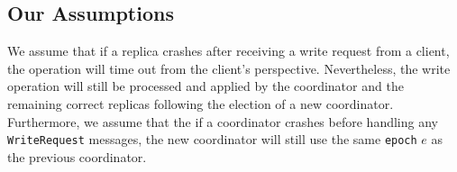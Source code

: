 \subsection{Our Assumptions}
We assume that if a replica crashes after receiving a write request from a
client, the operation will time out from the client's perspective.
Nevertheless, the write operation will still be processed and applied by the
coordinator and the remaining correct replicas following the election of a new coordinator.
Furthermore, we assume that the if a coordinator crashes before handling any \texttt{WriteRequest} messages, 
the new coordinator will still use the same \texttt{epoch} $e$ as the previous coordinator.
